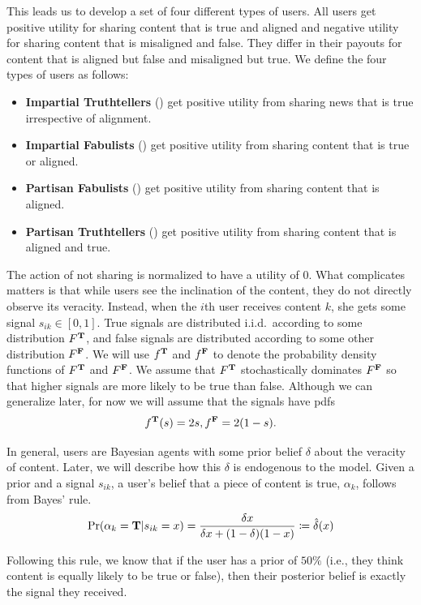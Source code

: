 This leads us to develop a set of four different types of users. All users get positive utility for sharing content that is true and aligned and negative utility for sharing content that is misaligned and false. They differ in their payouts for content that is aligned but false and misaligned but true. We define the four types of users as follows: 
\begin{itemize}
    \item \textbf{Impartial Truthtellers} (\IT) get positive utility from sharing news that is true irrespective of alignment. 
    \item \textbf{Impartial Fabulists} (\IF) get positive utility from sharing content that is true or aligned. 
    \item \textbf{Partisan Fabulists} (\PF) get positive utility from sharing content that is aligned. 
    \item \textbf{Partisan Truthtellers} (\PT) get positive utility from sharing content that is aligned and true. 
\end{itemize}


The action of not sharing is normalized to have a utility of 0. What complicates matters is that while users see the inclination of the content, they do not directly observe its veracity. Instead, when the $i$th user receives content $k$, she gets some signal $s_{ik} \in [0,1]$. True signals are distributed i.i.d.\  according to some distribution $F^{\mathbf{T}}$, and false signals are distributed according to some other distribution $F^{\mathbf{F}}$. We will use $f^{\mathbf{T}}$ and $f^{\mathbf{F}}$ to denote the probability density functions of $F^{\mathbf{T}}$ and  $F^{\mathbf{F}}$. We assume that $F^{\mathbf{T}}$ stochastically dominates $F^{\mathbf{F}}$ so that higher signals are more likely to be true than false.  Although we can generalize later, for now we will assume that the signals have pdfs 
\[
f^{\mathbf{T}}(s) = 2s , f^{\mathbf{F}} = 2(1-s).
\]

In general, users are Bayesian agents with some prior belief $\delta$ about the veracity of content. Later, we will describe how this $\delta$ is endogenous to the model. Given a prior and a signal $s_{ik}$, a user's belief that a piece of content is true, $\alpha_k$, follows from Bayes' rule. 
\begin{equation}
    \Pr(\alpha_k = \mathbf{T} | s_{ik} = x ) = \frac{\delta x}{ \delta x + (1-\delta) (1-x) }\coloneqq \hat{\delta}(x)
\end{equation}

Following this rule, we know that if the user has a prior of $50\%$ (i.e., they think content is equally likely to be true or false), then their posterior belief is exactly the signal they received. 
